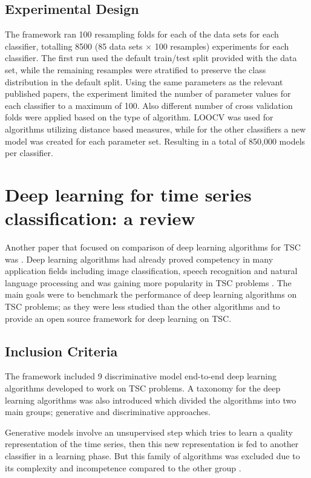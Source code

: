\subsection{Experimental Design}
\label{subsectionUniBakeoffExperiment}
The framework ran 100 resampling folds for each of the data sets for each classifier, totalling 8500 (85 data sets $\times$ 100 resamples) experiments for each classifier.
The first run used the default train/test split provided with the data set, while the remaining resamples were stratified to preserve the class distribution in the default split.
Using the same parameters as the relevant published papers, the experiment limited the number of parameter values for each classifier to a maximum of 100.
Also different number of cross validation folds were applied based on the type of algorithm. LOOCV was used for algorithms utilizing distance based measures,
while for the other classifiers a new model was created for each parameter set. Resulting in a total of 850,000 models per classifier.

\section{Deep learning for time series classification: a review}
\label{DeepLearningReview}
Another paper that focused on comparison of deep learning algorithms for TSC was \cite{fawaz2019deepreview}.
Deep learning algorithms had already proved competency in many application fields including image classification, speech recognition and natural language processing \cite{he2016deep,santos2016literature,krizhevsky2012imagenet,guan2019towards}
and was gaining more popularity in TSC problems \cite{zheng2014time,zheng2016exploiting,zhao2017convolutional}.
The main goals were to benchmark the performance of deep learning algorithms on TSC problems; as they were less studied than the other algorithms and to provide an open source framework for deep learning on TSC.

\subsection{Inclusion Criteria}
\label{subsectionDeepLearningReviewInclusion}
The framework included 9 discriminative model end-to-end deep learning algorithms developed to work on TSC problems.
A taxonomy for the deep learning algorithms was also introduced which divided the algorithms into two main groups; generative and discriminative approaches.

Generative models involve an unsupervised step which tries to learn a quality representation of the time series, then this new representation is fed to another classifier in a learning phase.
But this family of algorithms was excluded due to its complexity and incompetence compared to the other group \cite{le2017time,bagnall2017great}.

